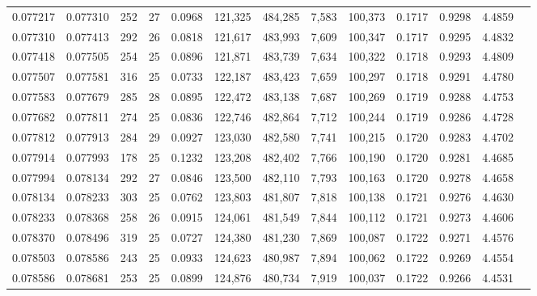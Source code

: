 \begin{tabular}{rrrrrrrrrrrrr}
0.077217 & 0.077310 & 252 &  27 &                                     0.0968 & 121,325 & 484,285 &   7,583 & 100,373 & 0.1717 & 0.9298 & 4.4859 \\
0.077310 & 0.077413 & 292 &  26 &                                     0.0818 & 121,617 & 483,993 &   7,609 & 100,347 & 0.1717 & 0.9295 & 4.4832 \\
0.077418 & 0.077505 & 254 &  25 &                                     0.0896 & 121,871 & 483,739 &   7,634 & 100,322 & 0.1718 & 0.9293 & 4.4809 \\
0.077507 & 0.077581 & 316 &  25 &                                     0.0733 & 122,187 & 483,423 &   7,659 & 100,297 & 0.1718 & 0.9291 & 4.4780 \\
0.077583 & 0.077679 & 285 &  28 &                                     0.0895 & 122,472 & 483,138 &   7,687 & 100,269 & 0.1719 & 0.9288 & 4.4753 \\
0.077682 & 0.077811 & 274 &  25 &                                     0.0836 & 122,746 & 482,864 &   7,712 & 100,244 & 0.1719 & 0.9286 & 4.4728 \\
0.077812 & 0.077913 & 284 &  29 &                                     0.0927 & 123,030 & 482,580 &   7,741 & 100,215 & 0.1720 & 0.9283 & 4.4702 \\
0.077914 & 0.077993 & 178 &  25 &                                     0.1232 & 123,208 & 482,402 &   7,766 & 100,190 & 0.1720 & 0.9281 & 4.4685 \\
0.077994 & 0.078134 & 292 &  27 &                                     0.0846 & 123,500 & 482,110 &   7,793 & 100,163 & 0.1720 & 0.9278 & 4.4658 \\
0.078134 & 0.078233 & 303 &  25 &                                     0.0762 & 123,803 & 481,807 &   7,818 & 100,138 & 0.1721 & 0.9276 & 4.4630 \\
0.078233 & 0.078368 & 258 &  26 &                                     0.0915 & 124,061 & 481,549 &   7,844 & 100,112 & 0.1721 & 0.9273 & 4.4606 \\
0.078370 & 0.078496 & 319 &  25 &                                     0.0727 & 124,380 & 481,230 &   7,869 & 100,087 & 0.1722 & 0.9271 & 4.4576 \\
0.078503 & 0.078586 & 243 &  25 &                                     0.0933 & 124,623 & 480,987 &   7,894 & 100,062 & 0.1722 & 0.9269 & 4.4554 \\
0.078586 & 0.078681 & 253 &  25 &                                     0.0899 & 124,876 & 480,734 &   7,919 & 100,037 & 0.1722 & 0.9266 & 4.4531 \\

\end{tabular}
